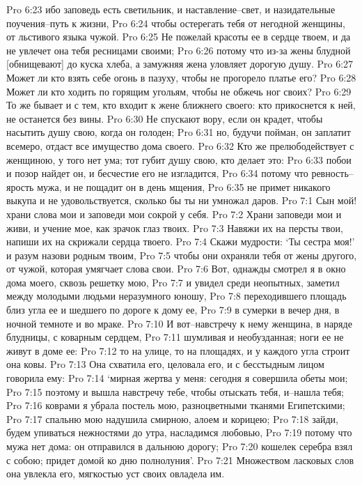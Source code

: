 Pro 6:23  ибо заповедь есть светильник, и наставление--свет, и назидательные поучения--путь к жизни,
Pro 6:24  чтобы остерегать тебя от негодной женщины, от льстивого языка чужой.
Pro 6:25  Не пожелай красоты ее в сердце твоем, и да не увлечет она тебя ресницами своими;
Pro 6:26  потому что из-за жены блудной [обнищевают] до куска хлеба, а замужняя жена уловляет дорогую душу.
Pro 6:27  Может ли кто взять себе огонь в пазуху, чтобы не прогорело платье его?
Pro 6:28  Может ли кто ходить по горящим угольям, чтобы не обжечь ног своих?
Pro 6:29  То же бывает и с тем, кто входит к жене ближнего своего: кто прикоснется к ней, не останется без вины.
Pro 6:30  Не спускают вору, если он крадет, чтобы насытить душу свою, когда он голоден;
Pro 6:31  но, будучи пойман, он заплатит всемеро, отдаст все имущество дома своего.
Pro 6:32  Кто же прелюбодействует с женщиною, у того нет ума; тот губит душу свою, кто делает это:
Pro 6:33  побои и позор найдет он, и бесчестие его не изгладится,
Pro 6:34  потому что ревность--ярость мужа, и не пощадит он в день мщения,
Pro 6:35  не примет никакого выкупа и не удовольствуется, сколько бы ты ни умножал даров.
Pro 7:1  Сын мой! храни слова мои и заповеди мои сокрой у себя.
Pro 7:2  Храни заповеди мои и живи, и учение мое, как зрачок глаз твоих.
Pro 7:3  Навяжи их на персты твои, напиши их на скрижали сердца твоего.
Pro 7:4  Скажи мудрости: `Ты сестра моя!' и разум назови родным твоим,
Pro 7:5  чтобы они охраняли тебя от жены другого, от чужой, которая умягчает слова свои.
Pro 7:6  Вот, однажды смотрел я в окно дома моего, сквозь решетку мою,
Pro 7:7  и увидел среди неопытных, заметил между молодыми людьми неразумного юношу,
Pro 7:8  переходившего площадь близ угла ее и шедшего по дороге к дому ее,
Pro 7:9  в сумерки в вечер дня, в ночной темноте и во мраке.
Pro 7:10  И вот--навстречу к нему женщина, в наряде блудницы, с коварным сердцем,
Pro 7:11  шумливая и необузданная; ноги ее не живут в доме ее:
Pro 7:12  то на улице, то на площадях, и у каждого угла строит она ковы.
Pro 7:13  Она схватила его, целовала его, и с бесстыдным лицом говорила ему:
Pro 7:14  `мирная жертва у меня: сегодня я совершила обеты мои;
Pro 7:15  поэтому и вышла навстречу тебе, чтобы отыскать тебя, и--нашла тебя;
Pro 7:16  коврами я убрала постель мою, разноцветными тканями Египетскими;
Pro 7:17  спальню мою надушила смирною, алоем и корицею;
Pro 7:18  зайди, будем упиваться нежностями до утра, насладимся любовью,
Pro 7:19  потому что мужа нет дома: он отправился в дальнюю дорогу;
Pro 7:20  кошелек серебра взял с собою; придет домой ко дню полнолуния'.
Pro 7:21  Множеством ласковых слов она увлекла его, мягкостью уст своих овладела им.
